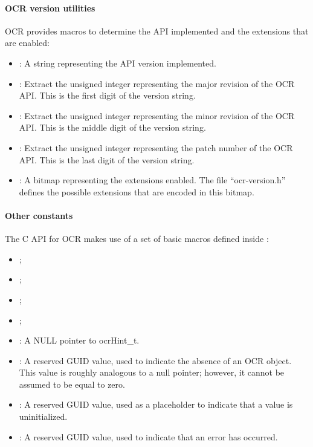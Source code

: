 \paragraph*{OCR version utilities}
OCR provides macros to determine the API implemented and the
extensions that are enabled:
\begin{itemize}
\item {}: A string representing the API version
  implemented.
\item {}: Extract the unsigned
  integer representing the major revision of the OCR API. This is the
  first digit of the version string.
\item {}: Extract the unsigned
  integer representing the minor revision of the OCR API. This is the
  middle digit of the version string.
\item {}: Extract the unsigned
  integer representing the patch number of the OCR API. This is the
  last digit of the version string.
\item {}: A bitmap representing
  the extensions enabled. The file ``ocr-version.h'' defines the
  possible extensions that are encoded in this bitmap.
\end{itemize}
\paragraph*{Other constants}
The C API for OCR makes use of a set of basic macros defined
inside :
\begin{itemize}
\item {};
\item {};
\item {};
\item {};
\item {}: A NULL pointer to ocrHint\_t.
\item {}: A reserved GUID value, used to indicate the absence of an OCR object.
This value is roughly analogous to a null pointer; however, it cannot be assumed to be equal to zero.
\item {}: A reserved GUID value, used as a placeholder to indicate
that a value is uninitialized.
\item {}: A reserved GUID value, used to indicate that an error has occurred.
\end{itemize}
